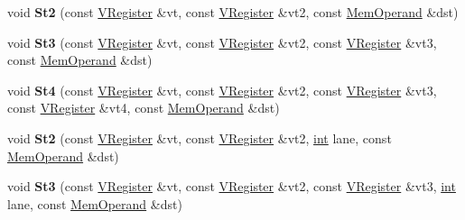 \begin{DoxyCompactItemize}
void {\bfseries St2} (const \mbox{\hyperlink{classv8_1_1internal_1_1VRegister}{V\+Register}} \&vt, const \mbox{\hyperlink{classv8_1_1internal_1_1VRegister}{V\+Register}} \&vt2, const \mbox{\hyperlink{classv8_1_1internal_1_1MemOperand}{Mem\+Operand}} \&dst)
\item 
\mbox{\label{classv8_1_1internal_1_1MacroAssembler_a16ad3cc8d97f35eeb743f77cf219a61d}} 
void {\bfseries St3} (const \mbox{\hyperlink{classv8_1_1internal_1_1VRegister}{V\+Register}} \&vt, const \mbox{\hyperlink{classv8_1_1internal_1_1VRegister}{V\+Register}} \&vt2, const \mbox{\hyperlink{classv8_1_1internal_1_1VRegister}{V\+Register}} \&vt3, const \mbox{\hyperlink{classv8_1_1internal_1_1MemOperand}{Mem\+Operand}} \&dst)
\item 
\mbox{\label{classv8_1_1internal_1_1MacroAssembler_a07a849f96e91cabe1c4c851e6444ac6c}} 
void {\bfseries St4} (const \mbox{\hyperlink{classv8_1_1internal_1_1VRegister}{V\+Register}} \&vt, const \mbox{\hyperlink{classv8_1_1internal_1_1VRegister}{V\+Register}} \&vt2, const \mbox{\hyperlink{classv8_1_1internal_1_1VRegister}{V\+Register}} \&vt3, const \mbox{\hyperlink{classv8_1_1internal_1_1VRegister}{V\+Register}} \&vt4, const \mbox{\hyperlink{classv8_1_1internal_1_1MemOperand}{Mem\+Operand}} \&dst)
\item 
\mbox{\label{classv8_1_1internal_1_1MacroAssembler_a5a21e0f0e2087a224aab5bbd3482ee34}} 
void {\bfseries St2} (const \mbox{\hyperlink{classv8_1_1internal_1_1VRegister}{V\+Register}} \&vt, const \mbox{\hyperlink{classv8_1_1internal_1_1VRegister}{V\+Register}} \&vt2, \mbox{\hyperlink{classint}{int}} lane, const \mbox{\hyperlink{classv8_1_1internal_1_1MemOperand}{Mem\+Operand}} \&dst)
\item 
\mbox{\label{classv8_1_1internal_1_1MacroAssembler_a7d578fdd789283d371922f59e319461c}} 
void {\bfseries St3} (const \mbox{\hyperlink{classv8_1_1internal_1_1VRegister}{V\+Register}} \&vt, const \mbox{\hyperlink{classv8_1_1internal_1_1VRegister}{V\+Register}} \&vt2, const \mbox{\hyperlink{classv8_1_1internal_1_1VRegister}{V\+Register}} \&vt3, \mbox{\hyperlink{classint}{int}} lane, const \mbox{\hyperlink{classv8_1_1internal_1_1MemOperand}{Mem\+Operand}} \&dst)
\item 

\end{DoxyCompactItemize}
